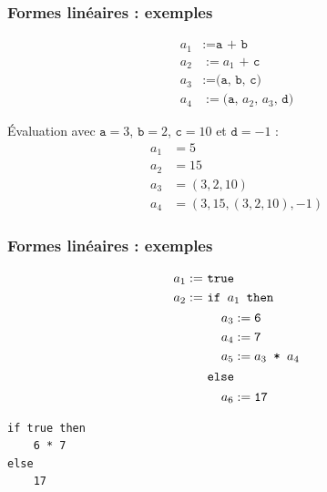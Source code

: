 \begin{frame}
    \frametitle{Formes linéaires : exemples}

    \begin{align*}
        a_1 & := \texttt{a + b}                \\
        a_2 & := \texttt{$a_1$ + c}            \\
        a_3 & := \texttt{(a, b, c)}            \\
        a_4 & := \texttt{(a, $a_2$, $a_3$, d)}
    \end{align*}

    \vspace{0.5cm}

    \pause

    Évaluation avec $\texttt{a} = 3$, $\texttt{b} = 2$, $\texttt{c} = 10$ et
    $\texttt{d} = -1$ :
    \begin{align*}
        a_1 & = 5                       \\
        a_2 & = 15                      \\
        a_3 & = (3, 2, 10)              \\
        a_4 & = (3, 15, (3, 2, 10), -1)
    \end{align*}
\end{frame}

\addtocounter{framenumber}{-1}
\begin{frame}[fragile]
    \frametitle{Formes linéaires : exemples}

    \begin{align*}
        a_1 := & \ \texttt{true}                              \\
        a_2 := & \ \texttt{if } a_1 \texttt{ then}            \\
               & \hspace{0.5cm} \begin{aligned}
                                    a_3 & := \texttt{6}           \\
                                    a_4 & := \texttt{7}           \\
                                    a_5 & := a_3 \texttt{ * } a_4
                                \end{aligned} \\
               & \ \texttt{else}                              \\
               & \hspace{0.5cm} \begin{aligned}
                                    a_6 & := \texttt{17}
                                \end{aligned}
    \end{align*}

    \pause

    \begin{verbatim}
if true then
    6 * 7
else
    17
    \end{verbatim}
\end{frame}

